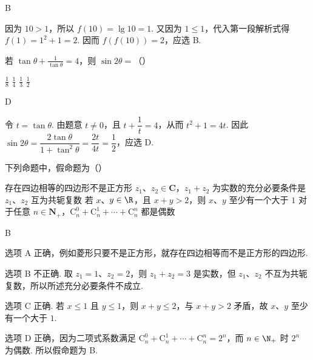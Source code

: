 \begin{answer}
B
\end{answer}

\begin{solution}
因为 \(10>1\)，所以 \(f(10)=\lg10=1\). 又因为 \(1\leqslant1\)，代入第一段解析式得 \(f(1)=1^2+1=2\). 因而 \(f(f(10))=2\)，应选 B.
\end{solution}

\begin{problem}
若 \(\tan \theta + \frac{1}{\tan \theta} = 4\)，则 \(\sin 2\theta =\)（\quad）

\choices
    {\( \frac{1}{8} \)}
    {\( \frac{1}{4} \)}
    {\( \frac{1}{3} \)}
    {\( \frac{1}{2} \)}
\end{problem}

\begin{answer}
D
\end{answer}

\begin{solution}
令 \(t=\tan\theta\). 由题意 \(t\neq0\)，且
\(t+\dfrac1t=4\)，从而 \(t^2+1=4t\). 因此
\(\sin2\theta=\dfrac{2\tan\theta}{1+\tan^2\theta}=\dfrac{2t}{4t}=\dfrac12\)，应选 D.
\end{solution}

\begin{problem}
下列命题中，假命题为（\quad）

\choices
    {存在四边相等的四边形不是正方形}
    {\(z_{1}\)、\(z_{2}\in\mathbf{C}\)，\(z_{1}+z_{2}\) 为实数的充分必要条件是 \(z_{1}\)、\(z_{2}\) 互为共轭复数}
    {若 \(x\)、\(y\in\R\)，且 \(x+y>2\)，则 \(x\)、\(y\) 至少有一个大于 \(1\)}
    {对于任意 \(n\in\mathbf{N}_{+}\)，\(\mathrm C_{n}^{0}+\mathrm C_{n}^{1}+\cdots+\mathrm C_{n}^{n}\) 都是偶数}
\end{problem}

\begin{answer}
B
\end{answer}

\begin{solution}
选项 A 正确，例如菱形只要不是正方形，就存在四边相等而不是正方形的四边形.

选项 B 不正确. 取 \(z_1=1\)、\(z_2=2\)，则 \(z_1+z_2=3\) 是实数，但 \(z_1\)、\(z_2\) 不互为共轭复数，所以所述充分必要条件不成立.

选项 C 正确. 若 \(x\leqslant1\) 且 \(y\leqslant1\)，则 \(x+y\leqslant2\)，与 \(x+y>2\) 矛盾，故 \(x\)、\(y\) 至少有一个大于 \(1\).

选项 D 正确，因为二项式系数满足
\(\mathrm C_n^0+\mathrm C_n^1+\cdots+\mathrm C_n^n=2^n\)，而 \(n\in\N_+\) 时 \(2^n\) 为偶数. 所以假命题为 B.
\end{solution}

